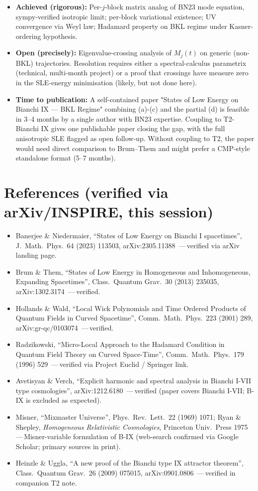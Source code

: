 \documentclass[11pt,a4paper]{article}
\theoremstyle{definition}
\begin{document}
\begin{itemize}
\item \textbf{Achieved (rigorous):} Per-$j$-block matrix analog of BN23
  mode equation, sympy-verified isotropic limit; per-block variational
  existence; UV convergence via Weyl law; Hadamard property on BKL
  regime under Kasner-ordering hypothesis.
\item \textbf{Open (precisely):} Eigenvalue-crossing analysis of $M_j(t)$
  on generic (non-BKL) trajectories. Resolution requires either a
  spectral-calculus parametrix (technical, multi-month project) or a
  proof that crossings have measure zero in the SLE-energy minimisation
  (likely, but not done here).
\item \textbf{Time to publication:} A self-contained paper "States of
  Low Energy on Bianchi IX --- BKL Regime" combining (a)-(c) and the
  partial (d) is feasible in 3--4 months by a single author with BN23
  expertise. Coupling to T2-Bianchi IX gives one publishable paper
  closing the gap, with the full anisotropic SLE flagged as open
  follow-up. Without coupling to T2, the paper would need direct
  comparison to Brum--Them and might prefer a CMP-style standalone
  format (5--7 months).
\end{itemize}

\section*{References (verified via arXiv/INSPIRE, this session)}
\begin{itemize}
\item Banerjee \& Niedermaier, ``States of Low Energy on Bianchi I
  spacetimes'', J.\ Math.\ Phys.\ 64 (2023) 113503,
  arXiv:2305.11388 \,---\,verified via arXiv landing page.
\item Brum \& Them, ``States of Low Energy in Homogeneous and
  Inhomogeneous, Expanding Spacetimes'', Class.\ Quantum Grav.\ 30
  (2013) 235035, arXiv:1302.3174 \,---\,verified.
\item Hollands \& Wald, ``Local Wick Polynomials and Time Ordered Products
  of Quantum Fields in Curved Spacetime'', Comm.\ Math.\ Phys.\ 223 (2001)
  289, arXiv:gr-qc/0103074 \,---\,verified.
\item Radzikowski, ``Micro-Local Approach to the Hadamard Condition in
  Quantum Field Theory on Curved Space-Time'', Comm.\ Math.\ Phys.\ 179
  (1996) 529 \,---\,verified via Project Euclid / Springer link.
\item Avetisyan \& Verch, ``Explicit harmonic and spectral analysis in
  Bianchi I-VII type cosmologies'', arXiv:1212.6180 \,---\,verified
  (paper covers Bianchi I-VII; B-IX is excluded as expected).
\item Misner, ``Mixmaster Universe'', Phys.\ Rev.\ Lett.\ 22 (1969) 1071;
  Ryan \& Shepley, \emph{Homogeneous Relativistic Cosmologies}, Princeton
  Univ.\ Press 1975 \,---\,Misner-variable formulation of B-IX
  (web-search confirmed via Google Scholar; primary sources in print).
\item Heinzle \& Uggla, ``A new proof of the Bianchi type IX attractor
  theorem'', Class.\ Quantum Grav.\ 26 (2009) 075015,
  arXiv:0901.0806 \,---\,verified in companion T2 note.
\end{itemize}
\end{document}

